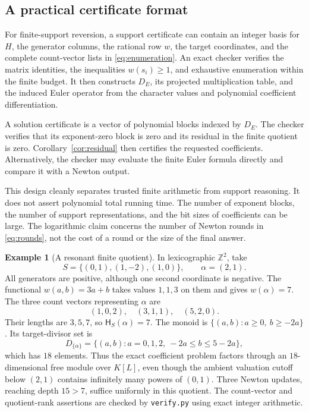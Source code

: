 \documentclass[11pt,a4paper]{article}
\theoremstyle{definition}
\newtheorem{example}[theorem]{Example}
\theoremstyle{remark}
\newcommand{\Z}{\mathbb Z}
\newcommand{\depth}{\mathsf H}
\newcommand{\pathcode}[1]{\nolinkurl{#1}}
\begin{document}
\subsection{A practical certificate format}
For finite-support reversion, a support certificate can contain an integer
basis for $H$, the generator columns, the rational row $w$, the target
coordinates, and the complete count-vector lists in
\eqref{eq:enumeration}. An exact checker verifies the matrix identities,
the inequalities $w(s_i)\ge1$, and exhaustive enumeration within the finite
budget. It then constructs $D_E$, its projected multiplication table, and
the induced Euler operator from the character values and polynomial
coefficient differentiation.

A solution certificate is a vector of polynomial blocks indexed by $D_E$.
The checker verifies that its exponent-zero block is zero and its residual
in the finite quotient is zero. Corollary~\ref{cor:residual} then certifies
the requested coefficients. Alternatively, the checker may evaluate the
finite Euler formula directly and compare it with a Newton output.

This design cleanly separates trusted finite arithmetic from support
reasoning. It does not assert polynomial total running time. The number
of exponent blocks, the number of support representations, and the bit
sizes of coefficients can be large. The logarithmic claim concerns the
number of Newton rounds in \eqref{eq:rounds}, not the cost of a round or the
size of the final answer.

\begin{example}[A resonant finite quotient]\label{ex:finitequotient}
In lexicographic $\Z^2$, take
\[
 S=\{(0,1),(1,-2),(1,0)\},\qquad \alpha=(2,1).
\]
All generators are positive, although one second coordinate is negative.
The functional $w(a,b)=3a+b$ takes values $1,1,3$ on them and gives
$w(\alpha)=7$. The three count vectors representing $\alpha$ are
\[
 (1,0,2),\quad(3,1,1),\quad(5,2,0).
\]
Their lengths are $3,5,7$, so $\depth_S(\alpha)=7$. The monoid is
$\{(a,b):a\ge0,\ b\ge-2a\}$. Its target-divisor set is
\[
 D_{\{\alpha\}}=
 \{(a,b):a=0,1,2,\ -2a\le b\le5-2a\},
\]
which has $18$ elements. Thus the exact coefficient problem factors through
an $18$-dimensional free module over $K[L]$, even though the ambient
valuation cutoff below $(2,1)$ contains infinitely many powers of $(0,1)$.
Three Newton updates, reaching depth $15>7$, suffice uniformly in this
quotient. The count-vector and quotient-rank assertions are checked by
\pathcode{verify.py} using exact integer arithmetic.
\end{example}
\end{document}

